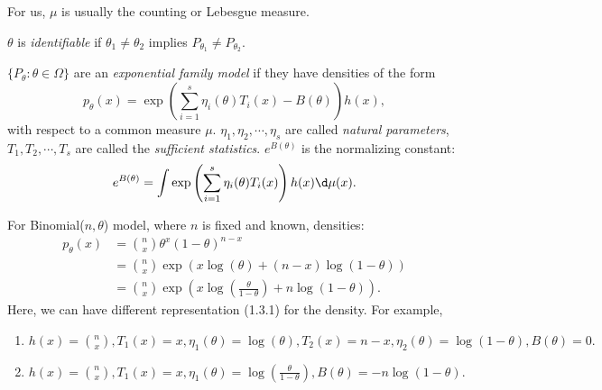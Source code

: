 \documentclass[a4paper]{article}
\begin{document}
\begin{note}
	For us, $\mu$ is usually the counting or Lebesgue measure.
\end{note}

\begin{defi}[Identifiability]
	$\theta$ is \emph{identifiable} if $\theta_1 \neq \theta_2$ implies $P_{\theta_1} \neq P_{\theta_2}.$
\end{defi}

\begin{defi}
	$\{P_{\theta}: \theta \in \Omega\}$ are an \emph{exponential family model} if they have densities of the form
	\begin{equation}
		p_{\theta} (x) = \exp\left(\sum\limits_{i = 1}^s {\eta}_i (\theta) T_i (x) - B(\theta)\right)h(x),
	\end{equation}
	with respect to a common measure $\mu$.
	${\eta}_1, \eta_2, \cdots, {\eta}_s$ are called \emph{natural parameters}, $T_1, T_2, \cdots, T_s$ are called the \emph{sufficient statistics}. $e^{B(\theta)}$ is the normalizing constant:
	\begin{equation}
		e^{B(\theta)} = \int \exp\left(\sum\limits_{i = 1}^s {\eta}_i (\theta) T_i (x)\right)h(x) \d \mu (x).
	\end{equation}
\end{defi}

\begin{eg}
	For Binomial($n, \theta$) model, where $n$ is fixed and known, densities:
	\begin{equation*}
		\begin{aligned}
			p_{\theta}(x) &= \binom{n}{x} {\theta}^x {(1-\theta)}^{n-x} \\
			&= \binom{n}{x}\exp \left(x\log(\theta) + (n-x)\log(1-\theta)\right)\\
			& = \binom{n}{x} \exp \left(x\log\left(\frac{\theta}{1 - \theta}\right) + n\log(1 - \theta)\right).
		\end{aligned}
	\end{equation*}
	Here, we can have different representation (1.3.1) for the density. For example,
	\begin{enumerate}
		\item $h(x) = \binom{n}{x}, T_1 (x) = x, {\eta}_1 (\theta) = \log (\theta), T_2 (x) = n-x, {\eta}_2 (\theta) = \log(1 - \theta), B(\theta) = 0.$
		\item $h(x) = \binom{n}{x}, T_1 (x) = x, {\eta}_1 (\theta) = \log \left(\frac{\theta}{1 - \theta}\right), B(\theta) = -n\log (1 - \theta).$
	\end{enumerate}
\end{eg}
\end{document}
